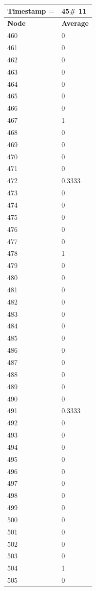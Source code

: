 \begin{tabular}{|l||l|}
\hline
\textbf{Timestamp =} & \textbf{45}\# 11\\\hline
	\textbf{Node} & \textbf{Average} \\ \hline
\hline
	460 & 0 \\ \hline
	461 & 0 \\ \hline
	462 & 0 \\ \hline
	463 & 0 \\ \hline
	464 & 0 \\ \hline
	465 & 0 \\ \hline
	466 & 0 \\ \hline
	467 & 1 \\ \hline
	468 & 0 \\ \hline
	469 & 0 \\ \hline
	470 & 0 \\ \hline
	471 & 0 \\ \hline
	472 & 0.3333 \\ \hline
	473 & 0 \\ \hline
	474 & 0 \\ \hline
	475 & 0 \\ \hline
	476 & 0 \\ \hline
	477 & 0 \\ \hline
	478 & 1 \\ \hline
	479 & 0 \\ \hline
	480 & 0 \\ \hline
	481 & 0 \\ \hline
	482 & 0 \\ \hline
	483 & 0 \\ \hline
	484 & 0 \\ \hline
	485 & 0 \\ \hline
	486 & 0 \\ \hline
	487 & 0 \\ \hline
	488 & 0 \\ \hline
	489 & 0 \\ \hline
	490 & 0 \\ \hline
	491 & 0.3333 \\ \hline
	492 & 0 \\ \hline
	493 & 0 \\ \hline
	494 & 0 \\ \hline
	495 & 0 \\ \hline
	496 & 0 \\ \hline
	497 & 0 \\ \hline
	498 & 0 \\ \hline
	499 & 0 \\ \hline
	500 & 0 \\ \hline
	501 & 0 \\ \hline
	502 & 0 \\ \hline
	503 & 0 \\ \hline
	504 & 1 \\ \hline
	505 & 0 \\ \hline
\end{tabular}
